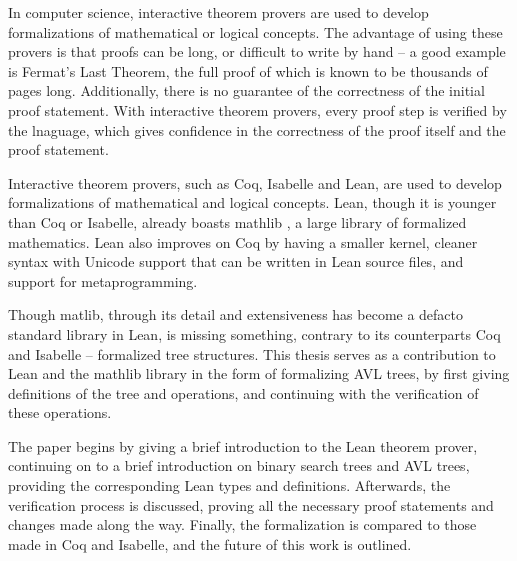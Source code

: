 In computer science, interactive theorem provers are used to develop formalizations of mathematical or logical concepts. The advantage of using these provers is that proofs can be long, or difficult to write by hand -- a good example is Fermat's Last Theorem, the full proof of which is known to be thousands of pages long. Additionally, there is no guarantee of the correctness of the initial proof statement. With interactive theorem provers, every proof step is verified by the lnaguage, which gives confidence in the correctness of the proof itself and the proof statement.

Interactive theorem provers, such as Coq, Isabelle and Lean, are used to develop formalizations of mathematical and logical concepts. Lean, though it is younger than Coq or Isabelle, already boasts mathlib \cite{The_mathlib_Community_2020}, a large library of formalized mathematics. Lean also improves on Coq by having a smaller kernel, cleaner syntax with Unicode support that can be written in Lean source files, and support for metaprogramming. 

Though matlib, through its detail and extensiveness has become a defacto standard library in Lean, is missing something, contrary to its counterparts Coq and Isabelle -- formalized tree structures. This thesis serves as a contribution to Lean and the mathlib library in the form of formalizing AVL trees, by first giving definitions of the tree and operations, and continuing with the verification of these operations.

The paper begins by giving a brief introduction to the Lean theorem prover, continuing on to a brief introduction on binary search trees and AVL trees, providing the corresponding Lean types and definitions. Afterwards, the verification process is discussed, proving all the necessary proof statements and changes made along the way. Finally, the formalization is compared to those made in Coq and Isabelle, and the future of this work is outlined.